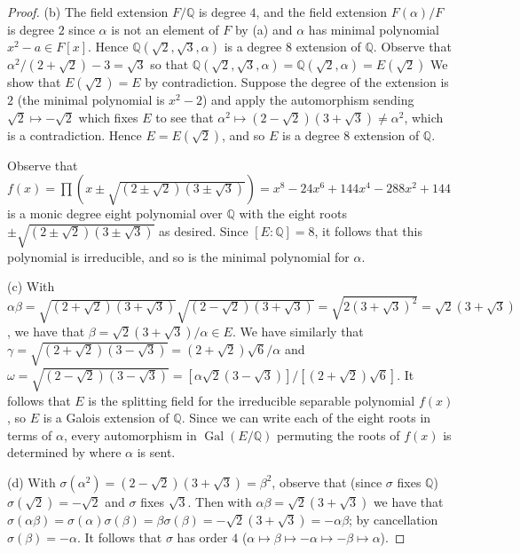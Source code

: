 \documentclass[11pt]{article}
\DeclareMathOperator{\Gal}{Gal}
\begin{document}
\begin{enumerate}
\begin{proof}
        (b) The field extension $F/\mathbb{Q}$ is degree $4$, and the field extension $F(\alpha)/F$ is degree $2$ since $\alpha$ is not an element of $F$ by (a) and $\alpha$ has minimal polynomial $x^2-a\in F[x]$. Hence $\mathbb{Q}(\sqrt{2},\sqrt{3},\alpha)$ is a degree $8$ extension of $\mathbb{Q}$. Observe that $\alpha^2/(2+\sqrt{2}) - 3 = \sqrt{3}$ so that $\mathbb{Q}(\sqrt{2},\sqrt{3},\alpha) = \mathbb{Q}(\sqrt{2},\alpha) = E(\sqrt{2})$ We show that $E(\sqrt{2}) = E$ by contradiction. Suppose the degree of the extension is $2$ (the minimal polynomial is $x^2-2$) and apply the automorphism sending $\sqrt{2}\mapsto -\sqrt{2}$ which fixes $E$ to see that $\alpha^2\mapsto (2-\sqrt{2})(3+\sqrt{3})\neq \alpha^2$, which is a contradiction. Hence $E = E(\sqrt{2})$, and so $E$ is a degree $8$ extension of $\mathbb{Q}$. 

        Observe that $f(x) = \prod \left(x \pm\sqrt{(2\pm \sqrt{2})(3\pm \sqrt{3})}\right) = x^8 - 24 x^6 + 144 x^4 - 288 x^2 + 144$ is a monic degree eight polynomial over $\mathbb{Q}$ with the eight roots $\pm\sqrt{(2\pm \sqrt{2})(3\pm \sqrt{3})}$ as desired. Since $[E\colon \mathbb{Q}] = 8$, it follows that this polynomial is irreducible, and so is the minimal polynomial for $\alpha$.

        (c) With $\alpha\beta = \sqrt{(2+\sqrt{2})(3+\sqrt{3})}\sqrt{(2-\sqrt{2})(3+\sqrt{3})} = \sqrt{2(3+\sqrt{3})^2} = \sqrt{2}(3+\sqrt{3})$, we have that $\beta = \sqrt{2}(3+\sqrt{3})/\alpha\in E$. We have similarly that $\gamma = \sqrt{(2+\sqrt{2})(3-\sqrt{3})} = (2+\sqrt{2})\sqrt{6}/\alpha$ and $\omega = \sqrt{(2-\sqrt{2})(3-\sqrt{3})} = [\alpha\sqrt{2}(3-\sqrt{3})]/[(2+\sqrt{2})\sqrt{6}]$. It follows that $E$ is the splitting field for the irreducible separable polynomial $f(x)$, so $E$ is a Galois extension of $\mathbb{Q}$. Since we can write each of the eight roots in terms of $\alpha$, every automorphism in $\Gal(E/\mathbb{Q})$ permuting the roots of $f(x)$ is determined by where $\alpha$ is sent.

        (d) With $\sigma(\alpha^2) = (2-\sqrt{2})(3+\sqrt{3}) = \beta^2$, observe that (since $\sigma$ fixes $\mathbb{Q}$) $\sigma(\sqrt{2}) = -\sqrt{2}$ and $\sigma$ fixes $\sqrt{3}$. Then with $\alpha\beta = \sqrt{2}(3+\sqrt{3})$ we have that $\sigma(\alpha\beta) = \sigma(\alpha)\sigma(\beta) = \beta\sigma(\beta) = -\sqrt{2}(3+\sqrt{3}) = -\alpha\beta$; by cancellation $\sigma(\beta) = -\alpha$. It follows that $\sigma$ has order $4$ ($\alpha\mapsto\beta\mapsto -\alpha\mapsto -\beta \mapsto \alpha$).
        

\end{proof}
\end{enumerate}
\end{document}
